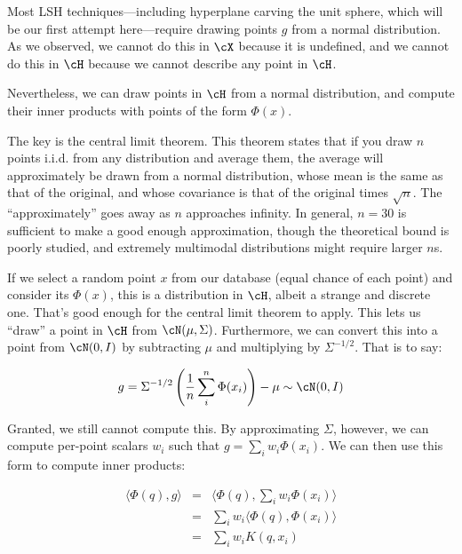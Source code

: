\documentclass[twoside,11pt]{homework}
\begin{document}
\begin{multicols}{2}
Most LSH techniques---including hyperplane carving the unit sphere,
which will be our first attempt here---require drawing points $g$ from a
normal distribution.  As we observed, we cannot do this in $\cX$
because it is undefined, and we cannot do this in $\cH$ because we
cannot describe any point in $\cH$.

Nevertheless, we can draw points in $\cH$ from a normal distribution,
and compute their inner products with points of the form $\Phi(x)$.

The key is the central limit theorem.  This theorem states that if you
draw $n$ points i.i.d. from any distribution and average
them, the average will approximately be drawn from a normal
distribution, whose mean is the same as that of the original, and
whose covariance is that of the original times $\sqrt{n}$.  The
``approximately'' goes away as $n$ approaches infinity.  In general,
$n=30$ is sufficient to make a good enough approximation, though the
theoretical bound is poorly studied, and extremely multimodal
distributions might require larger $n$s.

If we select a random point $x$ from our database (equal chance of
each point) and consider its $\Phi(x)$, this is a distribution in
$\cH$, albeit a strange and discrete one.  That's good enough for the
central limit theorem to apply.  This lets us ``draw'' a point in
$\cH$ from $\cN(\mu,\Sigma)$.  Furthermore, we can convert this into a
point from $\cN(0,I)$ by subtracting $\mu$ and multiplying by
$\Sigma^{-1/2}$.  That is to say:

\begin{equation*}
  g = \Sigma^{-1/2}\left(\frac{1}{n}\sum_i^n \Phi(x_i) \right) - \mu  \sim \cN(0,I)
\end{equation*}

Granted, we still cannot compute this.  By approximating $\Sigma$,
however, we can compute per-point scalars $w_i$ such that $g=\sum_i
w_i\Phi(x_i)$.  We can then use this form to compute
inner products:

\begin{eqnarray*}
  \langle \Phi(q), g \rangle
  & = & \langle \Phi(q), \sum_i w_i\Phi(x_i) \rangle \\
  & = & \sum_i w_i \langle \Phi(q), \Phi(x_i) \rangle \\
  & = & \sum_i w_i K(q, x_i) \\
\end{eqnarray*}



\end{multicols}
\end{document}
